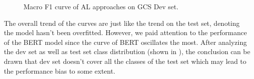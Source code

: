 \begin{figure}[th!]%
	\noindent
	\begin{center}
		
	\end{center}
	\noindent
	\begin{center}
	\end{center}	
	\caption{Macro F1 curve of AL approaches on GCS Dev set.}
	\label{fig:dev}
\end{figure}

The overall trend of the curves are just like the trend on the test set, denoting the model hasn't been overfitted. However, we paid attention to the performance of the BERT model since the curve of BERT oscillates the most. After analyzing the dev set as well as test set class distribution (shown in ), the conclusion can be drawn that dev set doesn't cover all the classes of the test set which may lead to the performance bias to some extent.

